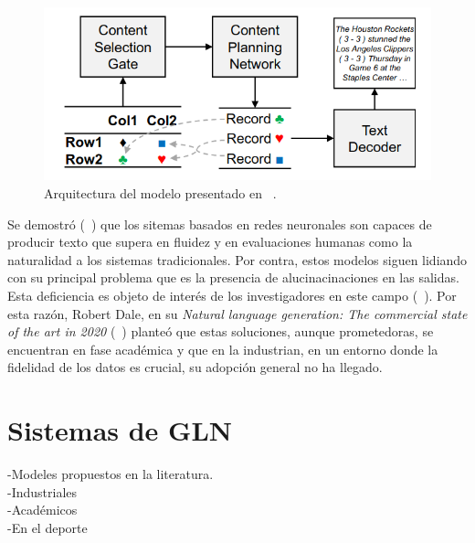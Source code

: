         \begin{figure}[!]
            \begin{center}
                \includegraphics[scale=0.4]{Graphics/lapata_arquitectura.png}
            \end{center}
            \caption{Arquitectura del modelo presentado en ~\cite{puduppully2019dataselandplan}.}
            \label{fig_lapata_arquitectura}
        \end{figure}

    Se demostró (~\cite{wiseman-etal-2017-challenges,feferreira2019neural,duvsek2020evaluating,sharma2022innovations}) que los sitemas basados en redes neuronales
 son capaces de producir texto que supera en fluidez y en evaluaciones humanas como la naturalidad a los sistemas tradicionales. Por contra, 
estos modelos siguen lidiando con su principal problema que es la presencia de alucinacinaciones en las salidas. Esta deficiencia es objeto de interés 
de los investigadores en este campo (~\cite{ji2022survey}). Por esta razón, Robert Dale, en su \textit{Natural language generation: The commercial state of
the art in 2020} (~\cite{dale2020natural}) planteó que estas soluciones, aunque prometedoras, se 
encuentran en fase académica y que en la industrian, en un entorno donde la fidelidad de los datos es crucial, su adopción general no ha llegado.   


\section{Sistemas de GLN}

    -Modeles propuestos en la literatura.\\
    -Industriales\\
    -Académicos\\
    -En el deporte\\

